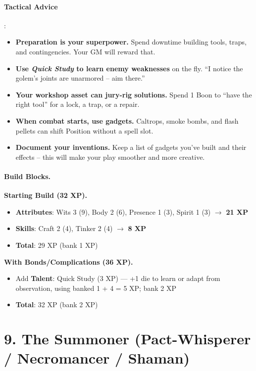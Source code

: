 \paragraph{Tactical Advice}:
\begin{itemize}
\item \textbf{Preparation is your superpower.} Spend downtime building tools, traps, and contingencies. Your GM will reward that.
\item \textbf{Use \emph{Quick Study} to learn enemy weaknesses} on the fly. ``I notice the golem's joints are unarmored -- aim there.''
\item \textbf{Your workshop asset can jury-rig solutions.} Spend 1 Boon to ``have the right tool'' for a lock, a trap, or a repair.
\item \textbf{When combat starts, use gadgets.} Caltrops, smoke bombs, and flash pellets can shift Position without a spell slot.
\item \textbf{Document your inventions.} Keep a list of gadgets you've built and their effects -- this will make your play smoother and more creative.
\end{itemize}

\paragraph{Build Blocks.}
\textbf{Starting Build (32 XP).}
\begin{itemize}
\item \textbf{Attributes}: Wits 3 (9), Body 2 (6), Presence 1 (3), Spirit 1 (3) \(\rightarrow\) \textbf{21 XP}
\item \textbf{Skills}: Craft 2 (4), Tinker 2 (4) \(\rightarrow\) \textbf{8 XP}
\item \textbf{Total}: 29 XP (bank 1 XP)
\end{itemize}
\textbf{With Bonds/Complications (36 XP).}
\begin{itemize}
\item Add \textbf{Talent}: Quick Study (3 XP) --- +1 die to learn or adapt from observation, using banked 1 + 4 = 5 XP; bank 2 XP
\item \textbf{Total}: 32 XP (bank 2 XP)
\end{itemize}

\section{9. The Summoner (Pact-Whisperer / Necromancer / Shaman)}
\label{sec:concept-summoner}

